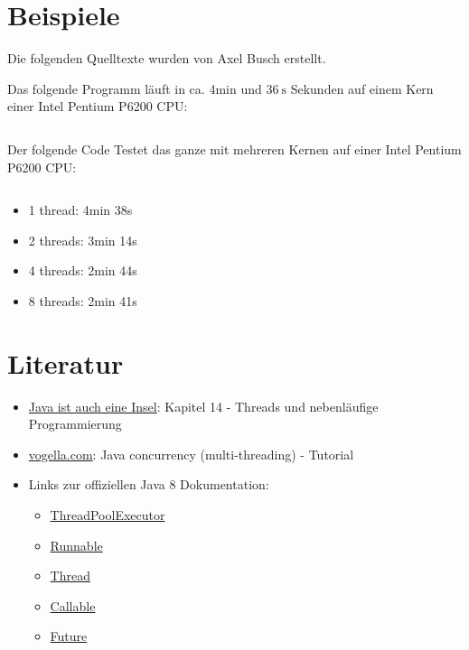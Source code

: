 \section{Beispiele}

Die folgenden Quelltexte wurden von Axel Busch erstellt.

Das folgende Programm läuft in ca. 4min und $\SI{36}{\second}$ Sekunden auf einem Kern einer
Intel Pentium P6200 CPU:

\inputminted[linenos, numbersep=5pt, tabsize=4, frame=lines, label=SingleCorePrimeTest.java]{java}{scripts/java/SingleCorePrimeTest.java}

Der folgende Code Testet das ganze mit mehreren Kernen auf einer Intel Pentium
P6200 CPU:
\inputminted[linenos, numbersep=5pt, tabsize=4, frame=lines, label=MultipleCorePrimeTest.java]{java}{scripts/java/MultipleCorePrimeTest.java}

\begin{itemize}
    \item 1 thread: 4min 38s
    \item 2 threads: 3min 14s
    \item 4 threads: 2min 44s
    \item 8 threads: 2min 41s
\end{itemize}

\section{Literatur}
\begin{itemize}
    \item \href{http://openbook.galileocomputing.de/javainsel9/javainsel_14_004.htm}{Java ist auch eine Insel}: Kapitel 14 -
          Threads und nebenläufige Programmierung
    \item \href{http://www.vogella.com/tutorials/JavaConcurrency/article.html}{vogella.com}: Java concurrency (multi-threading) - Tutorial
    \item Links zur offiziellen Java 8 Dokumentation:
        \begin{itemize}
            \item \href{http://docs.oracle.com/javase/8/docs/api/java/util/concurrent/ThreadPoolExecutor.html}{ThreadPoolExecutor}
            \item \href{http://docs.oracle.com/javase/8/docs/api/java/lang/Runnable.html}{Runnable}
            \item \href{http://docs.oracle.com/javase/8/docs/api/java/lang/Thread.html}{Thread}
            \item \href{http://docs.oracle.com/javase/8/docs/api/java/util/concurrent/Callable.html}{Callable}
            \item \href{http://docs.oracle.com/javase/8/docs/api/java/util/concurrent/Future.html}{Future}
        \end{itemize}
\end{itemize}

